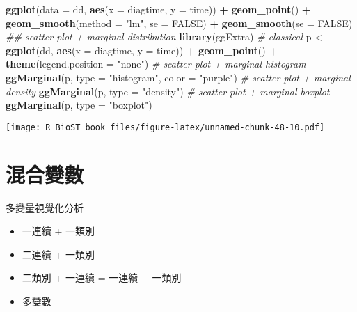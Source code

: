 \documentclass[
]{book}
\newenvironment{Shaded}{\begin{snugshade}}{\end{snugshade}}
\newcommand{\CommentTok}[1]{\textcolor[rgb]{0.56,0.35,0.01}{\textit{#1}}}
\newcommand{\DataTypeTok}[1]{\textcolor[rgb]{0.13,0.29,0.53}{#1}}
\newcommand{\KeywordTok}[1]{\textcolor[rgb]{0.13,0.29,0.53}{\textbf{#1}}}
\newcommand{\NormalTok}[1]{#1}
\newcommand{\OperatorTok}[1]{\textcolor[rgb]{0.81,0.36,0.00}{\textbf{#1}}}
\newcommand{\OtherTok}[1]{\textcolor[rgb]{0.56,0.35,0.01}{#1}}
\newcommand{\StringTok}[1]{\textcolor[rgb]{0.31,0.60,0.02}{#1}}
\providecommand{\tightlist}{%
  \setlength{\itemsep}{0pt}\setlength{\parskip}{0pt}}
\begin{document}
\begin{Shaded}
\begin{Highlighting}[]
\KeywordTok{ggplot}\NormalTok{(}\DataTypeTok{data =}\NormalTok{ dd, }\KeywordTok{aes}\NormalTok{(}\DataTypeTok{x =}\NormalTok{ diagtime, }\DataTypeTok{y =}\NormalTok{ time)) }\OperatorTok{+}\StringTok{ }
\StringTok{  }\KeywordTok{geom\_point}\NormalTok{() }\OperatorTok{+}\StringTok{ }
\StringTok{  }\KeywordTok{geom\_smooth}\NormalTok{(}\DataTypeTok{method =} \StringTok{"lm"}\NormalTok{, }\DataTypeTok{se =} \OtherTok{FALSE}\NormalTok{) }\OperatorTok{+}\StringTok{ }
\StringTok{  }\KeywordTok{geom\_smooth}\NormalTok{(}\DataTypeTok{se =} \OtherTok{FALSE}\NormalTok{)}
\CommentTok{\#\# scatter plot + marginal distribution}
\KeywordTok{library}\NormalTok{(ggExtra)}
\CommentTok{\# classical}
\NormalTok{p \textless{}{-}}\StringTok{ }\KeywordTok{ggplot}\NormalTok{(dd, }\KeywordTok{aes}\NormalTok{(}\DataTypeTok{x =}\NormalTok{ diagtime, }\DataTypeTok{y =}\NormalTok{ time)) }\OperatorTok{+}
\StringTok{      }\KeywordTok{geom\_point}\NormalTok{() }\OperatorTok{+}
\StringTok{      }\KeywordTok{theme}\NormalTok{(}\DataTypeTok{legend.position =} \StringTok{"none"}\NormalTok{)}
\CommentTok{\# scatter plot + marginal histogram}
\KeywordTok{ggMarginal}\NormalTok{(p, }\DataTypeTok{type =} \StringTok{"histogram"}\NormalTok{, }\DataTypeTok{color =} \StringTok{"purple"}\NormalTok{)}
\CommentTok{\# scatter plot + marginal density}
\KeywordTok{ggMarginal}\NormalTok{(p, }\DataTypeTok{type =} \StringTok{"density"}\NormalTok{)}
\CommentTok{\# scatter plot + marginal boxplot}
\KeywordTok{ggMarginal}\NormalTok{(p, }\DataTypeTok{type =} \StringTok{"boxplot"}\NormalTok{)}
\end{Highlighting}
\end{Shaded}

\texttt{[image: R\_BioST\_book\_files/figure-latex/unnamed-chunk-48-10.pdf]}

\hypertarget{ux6df7ux5408ux8b8aux6578}{%
\section{混合變數}\label{ux6df7ux5408ux8b8aux6578}}

多變量視覺化分析

\begin{itemize}
\tightlist
\item
  一連續 + 一類別
\item
  二連續 + 一類別
\item
  二類別 + 一連續 = 一連續 + 一類別
\item
  多變數
\end{itemize}
\end{document}
